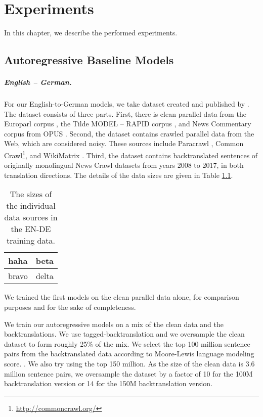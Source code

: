 \chapter{Experiments}
\label{chap:experiments}

In this chapter, we describe the performed experiments. 

\section{Autoregressive Baseline Models}
\label{sec:exp:autoregressive}

\paragraph{English -- German.} For our English-to-German models, we take
dataset created and published by \citet{germann2020university}. The dataset
consists of three parts. First, there is clean parallel data from the Europarl
corpus \citep{koehn2005europarl}, the Tilde MODEL -- RAPID corpus
\citep{rozis-skadins-2017-tilde}, and News Commentary corpus from OPUS
\citep{tiedemann2012opus}. Second, the dataset contains crawled parallel data
from the Web, which are considered noisy. These sources include Paracrawl
\citep{espla-etal-2019-paracrawl}, Common
Crawl\footnote{\url{http://commoncrawl.org/}}, and WikiMatrix
\citep{schwenk2019wikimatrix}. Third, the dataset contains backtranslated
sentences of originally monolingual News Crawl datasets from years 2008 to
2017, in both translation directions. The details of the data sizes are given
in Table \ref{tab:ende-data-sizes}.

\begin{table}
  \centering
  \begin{tabular}{cc}
    \toprule
    haha & beta \\
    \midrule
    bravo & delta \\
    \bottomrule
  \end{tabular}

  \caption{The sizes of the individual data sources in the EN-DE training
    data.}%
  \label{tab:ende-data-sizes}
\end{table}

We trained the first models on the clean parallel data alone, for comparison
purposes and for the sake of completeness.


We train our autoregressive models on a mix of the clean data and the
backtranslations. We use tagged-backtranslation and we oversample the clean
dataset to form roughly 25\% of the mix. We select the top 100 million sentence
pairs from the backtranslated data according to Moore-Lewis language modeling
score. . We also try using
the top 150 million.  As the size of the clean data is 3.6
million sentence pairs, we oversample the dataset by a factor of 10 for the 100M
backtranslation version or 14 for the 150M backtranslation version.




